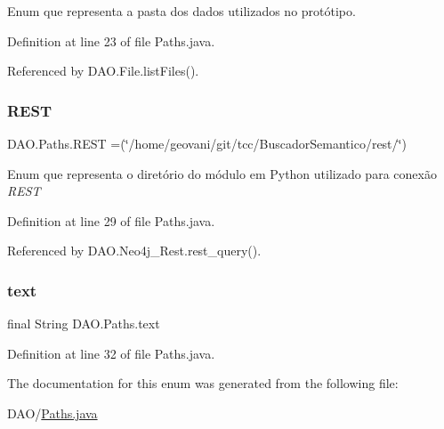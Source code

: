 Enum que representa a pasta dos dados utilizados no protótipo. 

Definition at line 23 of file Paths.\+java.



Referenced by D\+A\+O.\+File.\+list\+Files().

\hypertarget{enumDAO_1_1Paths_a43cc47a733e9d706d1b299cb16a13f7a}{}\label{enumDAO_1_1Paths_a43cc47a733e9d706d1b299cb16a13f7a} 
\subsubsection{\texorpdfstring{R\+E\+ST}{REST}}
{\footnotesize\ttfamily D\+A\+O.\+Paths.\+R\+E\+ST =(\char`\"{}/home/geovani/git/tcc/Buscador\+Semantico/rest/\char`\"{})}

Enum que representa o diretório do módulo em Python utilizado para conexão {\itshape R\+E\+ST} 

Definition at line 29 of file Paths.\+java.



Referenced by D\+A\+O.\+Neo4j\+\_\+\+Rest.\+rest\+\_\+query().

\hypertarget{enumDAO_1_1Paths_aea7fb1a9db7ac0c55f6f7c9c81852d98}{}\label{enumDAO_1_1Paths_aea7fb1a9db7ac0c55f6f7c9c81852d98} 
\subsubsection{\texorpdfstring{text}{text}}
{\footnotesize\ttfamily final String D\+A\+O.\+Paths.\+text\hspace{0.3cm}{\ttfamily [private]}}



Definition at line 32 of file Paths.\+java.



The documentation for this enum was generated from the following file\+:\begin{DoxyCompactItemize}
\item 
D\+A\+O/\hyperlink{Paths_8java}{Paths.\+java}\end{DoxyCompactItemize}
